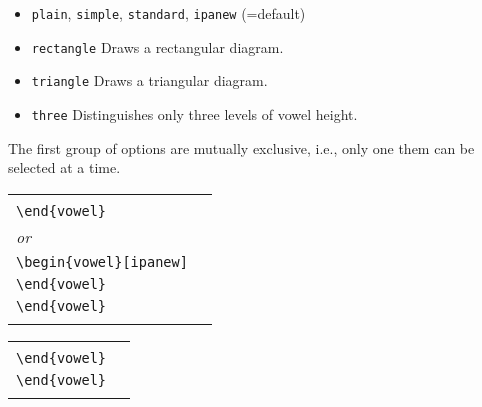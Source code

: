\documentclass[a4paper]{article}
\begin{document}
\begin{itemize}\itemsep0pt
\item \texttt{plain}, \texttt{simple}, \texttt{standard},
  \texttt{ipanew} (=default)
\item \texttt{rectangle} \quad Draws a rectangular diagram.
\item \texttt{triangle} \quad Draws a triangular diagram.
\item \texttt{three} \quad Distinguishes only three levels of vowel
  height.
\end{itemize}

The first group of options are mutually exclusive, i.e., only one them
can be selected at a time.

\begin{center}
\begin{tabular}{ll}
  \begin{minipage}[t]{5.5cm}{\small
    \verb|\begin{vowel}|\\
    \verb|\end{vowel}|\\
    \emph{or}\\
    \verb|\begin{vowel}[ipanew]|\\
    \verb|\end{vowel}|}
  \end{minipage} &
  \begin{minipage}[t]{5.5cm}{\small
    \verb|\begin{vowel}[plain]|\\
    \verb|\end{vowel}|}
  \end{minipage} \\
  \begin{vowel}[t]\end{vowel} &
  \begin{vowel}[t,plain]\end{vowel}
\end{tabular}

\begin{tabular}{ll}
  \begin{minipage}[t]{5.5cm}{\small
    \verb|\begin{vowel}[simple]|\\
    \verb|\end{vowel}|}
  \end{minipage} &
  \begin{minipage}[t]{5.5cm}{\small
    \verb|\begin{vowel}[standard]|\\
    \verb|\end{vowel}|}
  \end{minipage} \\
  \begin{vowel}[t,simple]\end{vowel} &
  \begin{vowel}[t,standard]\end{vowel}
\end{tabular}
\end{center}
\end{document}
